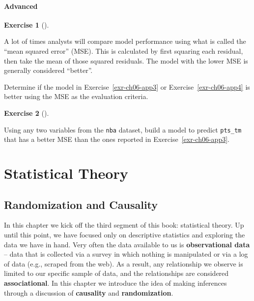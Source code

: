 \documentclass[
  letterpaper,
  DIV=11,
  numbers=noendperiod]{scrreprt}
\theoremstyle{definition}
\newtheorem{exercise}{Exercise}[chapter]
\theoremstyle{remark}
\begin{document}
\hypertarget{sec-ex06-advanced}{%
\subsection{Advanced}\label{sec-ex06-advanced}}

\begin{exercise}[]\protect\hypertarget{exr-ch06-adv1}{}\label{exr-ch06-adv1}

A lot of times analysts will compare model performance using what is
called the ``mean squared error'' (MSE). This is calculated by first
squaring each residual, then take the mean of those squared residuals.
The model with the lower MSE is generally considered ``better''.

Determine if the model in Exercise~\ref{exr-ch06-app3} or
Exercise~\ref{exr-ch06-app4} is better using the MSE as the evaluation
criteria.

\end{exercise}

\begin{exercise}[]\protect\hypertarget{exr-ch06-adv2}{}\label{exr-ch06-adv2}

Using any two variables from the \texttt{nba} dataset, build a model to
predict \texttt{pts\_tm} that has a better MSE than the ones reported in
Exercise~\ref{exr-ch06-app3}.

\end{exercise}

\part{Statistical Theory}

\hypertarget{sec-causality}{%
\chapter{Randomization and Causality}\label{sec-causality}}

In this chapter we kick off the third segment of this book: statistical
theory. Up until this point, we have focused only on descriptive
statistics and exploring the data we have in hand. Very often the data
available to us is \textbf{observational data} -- data that is collected
via a survey in which nothing is manipulated or via a log of data (e.g.,
scraped from the web). As a result, any relationship we observe is
limited to our specific sample of data, and the relationships are
considered \textbf{associational}. In this chapter we introduce the idea
of making inferences through a discussion of \textbf{causality} and
\textbf{randomization}.
\end{document}
